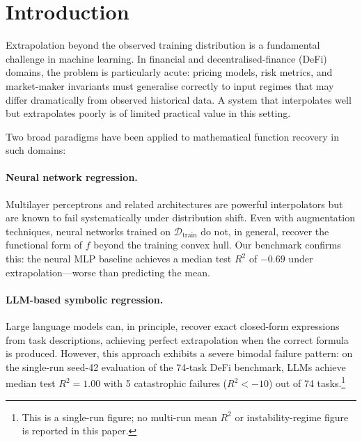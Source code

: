 \documentclass[twoside,11pt]{article}
\newcommand{\Rsq}{R^{2}}
\begin{document}
\section{Introduction}
\label{sec:intro}

Extrapolation beyond the observed training distribution is a fundamental challenge
in machine learning.  In financial and decentralised-finance (DeFi) domains, the
problem is particularly acute: pricing models, risk metrics, and market-maker
invariants must generalise correctly to input regimes that may differ dramatically
from observed historical data.  A system that interpolates well but extrapolates
poorly is of limited practical value in this setting.

Two broad paradigms have been applied to mathematical function recovery in such
domains:

\paragraph{Neural network regression.}
Multilayer perceptrons and related architectures are powerful interpolators but
are known to fail systematically under distribution shift.  Even with augmentation
techniques, neural networks trained on $\mathcal{D}_{\mathrm{train}}$ do not, in
general, recover the functional form of $f$ beyond the training convex hull.  Our
benchmark confirms this: the neural MLP baseline achieves a median test $\Rsq$ of
$-0.69$ under extrapolation---worse than predicting the mean.

\paragraph{LLM-based symbolic regression.}
Large language models can, in principle, recover exact closed-form expressions from
task descriptions, achieving perfect extrapolation when the correct formula is
produced.  However, this approach exhibits a severe bimodal failure pattern: on
the single-run seed-42 evaluation of the 74-task DeFi benchmark, LLMs achieve
median test $\Rsq=1.00$ with 5 catastrophic failures ($\Rsq < -10$) out of 74
tasks.\footnote{This is a single-run figure; no multi-run mean $\Rsq$ or
instability-regime figure is reported in this paper.}
\end{document}
